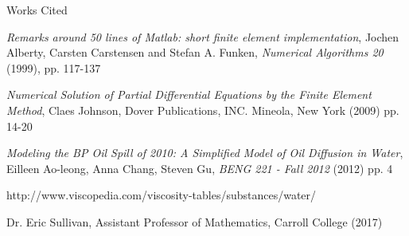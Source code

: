 \documentclass[10pt]{beamer}
\begin{document}
\begin{frame}{Works Cited}
\begin{thebibliography}{4}
\textit{Remarks around 50 lines of Matlab: short finite element implementation}, Jochen Alberty, Carsten Carstensen and Stefan A. Funken, \textit{Numerical Algorithms 20} (1999), pp. 117-137

\textit{Numerical Solution of Partial Differential Equations by the Finite Element Method}, Claes Johnson, Dover Publications, INC. Mineola, New York (2009) pp. 14-20

\textit{Modeling the BP Oil Spill of 2010: A Simplified Model of Oil Diffusion in Water}, Eilleen Ao-leong, Anna Chang, Steven Gu, \textit{BENG 221 - Fall 2012} (2012) pp. 4

http://www.viscopedia.com/viscosity-tables/substances/water/

Dr. Eric Sullivan, Assistant Professor of Mathematics, Carroll College (2017)

\end{thebibliography}
\end{frame}
\end{document}
